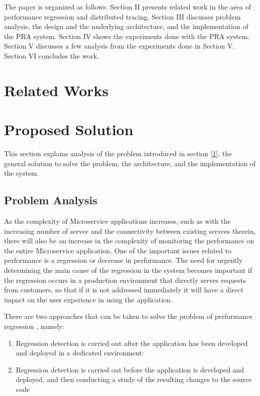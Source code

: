\documentclass[conference]{configs/IEEEtran}
\begin{document}
The paper is organized as follows. Section II presents related
work in the area of performance regression and distributed tracing. Section III discusses problem analysis, the design and the underlying architecture, and the implementation of the PRA system. Section IV shows the experiments done with the PRA system. Section V discusses a few analysis from the experiments done in Section V. Section
VI concludes the work.


\section{Related Works}

\section{Proposed Solution}
This section explains analysis of the problem introduced in section \ref{1}, the general solution to solve the problem, the architecture, and the implementation of the system.

\subsection{Problem Analysis}
As the complexity of Microservice applications increases, such as with the increasing number of servce and the connectivity between existing servces therein, there will also be an increase in the complexity of monitoring the performance on the entire Microservice application. One of the important issues related to performance is a regression or decrease in performance. The need for urgently determining the main cause of the regression in the system becomes important if the regression occurs in a production environment that directly serves requests from customers, so that if it is not addressed immediately it will have a direct impact on the
user experience in using the application.

There are two approaches that can be taken to solve the problem of performance regression \cite{regression-detection}, namely:
\begin{enumerate}
	\item Regression detection is carried out after the application has been developed and deployed in a dedicated environment:
	\item Regression detection is carried out before the application is developed and deployed, and then conducting a study of the resulting changes to the source code
\end{enumerate} 
\end{document}
